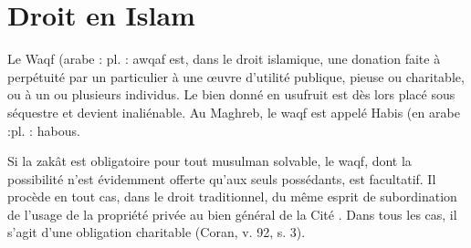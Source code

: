 \chapter{Droit en Islam}

\begin{Def}
Le Waqf (arabe : pl. : awqaf  est, dans le droit islamique, une donation faite à perpétuité par un particulier à une œuvre d'utilité publique, pieuse ou charitable, ou à un ou plusieurs individus. Le bien donné en usufruit est dès lors placé sous séquestre et devient inaliénable. Au Maghreb, le waqf est appelé Habis (en arabe :pl. : habous.
\end{Def}



Si la zakât est obligatoire pour tout musulman solvable, le waqf, dont la possibilité n'est évidemment offerte qu'aux seuls possédants, est facultatif. Il procède en tout cas, dans le droit traditionnel, du même esprit de subordination de l'usage de la propriété privée au bien général de la Cité . Dans tous les cas, il s'agit d'une obligation charitable (Coran, v. 92, s. 3).
